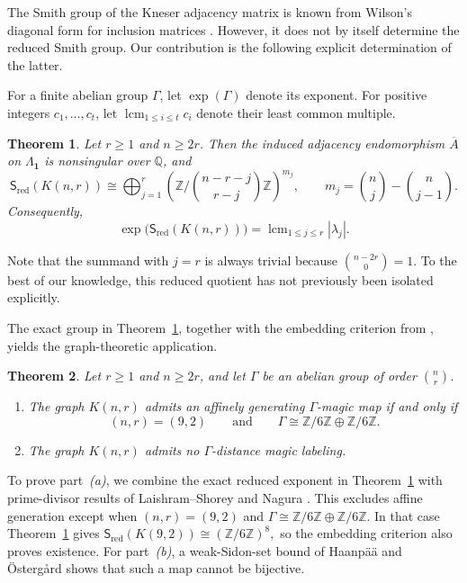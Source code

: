 \documentclass[11pt,reqno]{amsart}
\theoremstyle{plain}
\newtheorem{theorem}{Theorem}[section]
\theoremstyle{definition}
\theoremstyle{remark}
\DeclareMathOperator{\ex}{exp}
\newcommand{\Sred}{\mathsf S_{\mathrm{red}}}
\newcommand{\Lamone}{\Lambda_{\mathbf1}}
\begin{document}
The Smith group of the Kneser adjacency matrix is known from Wilson's diagonal
form for inclusion matrices \cite[Theorem~2]{Wil90}. However, it does not by
itself determine the reduced Smith group. Our contribution is the following
explicit determination of the latter.

For a finite abelian group $\Gamma$, let $\ex(\Gamma)$ denote its exponent. For
positive integers $c_1,\dots,c_t$, let
$\operatorname{lcm}_{1\le i\le t}c_i$ denote their least common multiple.
\begin{theorem}\label{thm:kneser-reduced-smith}
Let $r\ge1$ and $n\ge2r$. Then the induced adjacency endomorphism
$\overline A$ on $\Lamone$ is nonsingular over $\mathbb Q$, and
\[
  \Sred(K(n,r))\cong
  \bigoplus_{j=1}^{r}
  \left(\mathbb Z/\binom{n-r-j}{r-j}\mathbb Z\right)^{m_j},
  \qquad
  m_j=\binom nj-\binom n{j-1}.
\]
Consequently,
\[
  \ex\bigl(\Sred(K(n,r))\bigr)
  =\operatorname{lcm}_{1\le j\le r}|\lambda_j|.
\]
\end{theorem}

Note that the summand with $j=r$ is always trivial because
$\binom{n-2r}{0}=1$. To the best of our knowledge, this reduced quotient has not previously
been isolated explicitly.

The exact group in Theorem~\ref{thm:kneser-reduced-smith}, together with the
embedding criterion from \cite[Corollary~1.3(b)]{Bat26}, yields the
graph-theoretic application.

\begin{theorem}\label{thm:kneser-labeling}
Let $r\ge1$ and $n\ge2r$, and let $\Gamma$ be an abelian group of order
$\binom nr$.
\begin{enumerate}[label=\emph{(\alph*)},leftmargin=2.2em]
\item The graph $K(n,r)$ admits an affinely generating $\Gamma$-magic map if
and only if
\[
  (n,r)=(9,2)
  \qquad\text{and}\qquad
  \Gamma\cong\mathbb Z/6\mathbb Z\oplus\mathbb Z/6\mathbb Z.
\]
\item The graph $K(n,r)$ admits no $\Gamma$-distance magic labeling.
\end{enumerate}
\end{theorem}

To prove part~\emph{(a)}, we combine the exact reduced exponent in
Theorem~\ref{thm:kneser-reduced-smith} with prime-divisor results of
Laishram--Shorey and Nagura \cite{LS05,Nag52}. This excludes affine generation
except when
$(n,r)=(9,2)$ and
$\Gamma\cong\mathbb Z/6\mathbb Z\oplus\mathbb Z/6\mathbb Z$. In that case
Theorem~\ref{thm:kneser-reduced-smith} gives
$
  \Sred(K(9,2))\cong(\mathbb Z/6\mathbb Z)^8,
$
so the embedding criterion also proves existence. For part~\emph{(b)}, a
weak-Sidon-set bound of Haanp\"a\"a and \"Osterg\r{a}rd \cite{HO07} shows
that such a map cannot be bijective.
\end{document}
